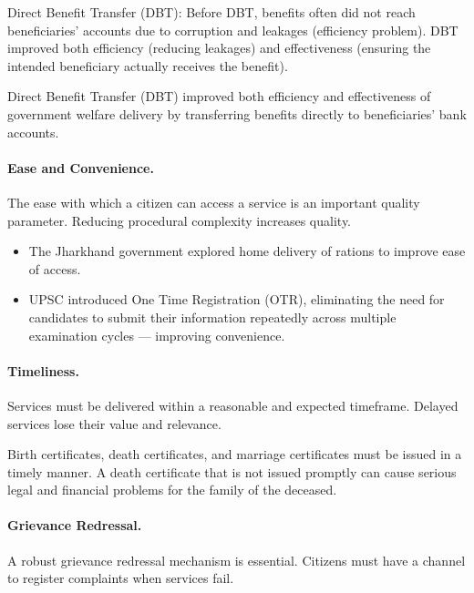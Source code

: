 \begin{ExampleBox}
Direct Benefit Transfer (DBT): Before DBT, benefits often did not reach beneficiaries' accounts due to corruption and leakages (efficiency problem). DBT improved both efficiency (reducing leakages) and effectiveness (ensuring the intended beneficiary actually receives the benefit).
\end{ExampleBox}

\begin{GovtPolicy}
Direct Benefit Transfer (DBT) improved both efficiency and effectiveness of government welfare delivery by transferring benefits directly to beneficiaries' bank accounts.
\end{GovtPolicy}

\paragraph{Ease and Convenience.} The ease with which a citizen can access a service is an important quality parameter. Reducing procedural complexity increases quality.

\begin{ExampleBox}
\begin{itemize}
\item The Jharkhand government explored home delivery of rations to improve ease of access.
\item UPSC introduced One Time Registration (OTR), eliminating the need for candidates to submit their information repeatedly across multiple examination cycles --- improving convenience.
\end{itemize}
\end{ExampleBox}

\paragraph{Timeliness.} Services must be delivered within a reasonable and expected timeframe. Delayed services lose their value and relevance.

\begin{ExampleBox}
Birth certificates, death certificates, and marriage certificates must be issued in a timely manner. A death certificate that is not issued promptly can cause serious legal and financial problems for the family of the deceased.
\end{ExampleBox}

\paragraph{Grievance Redressal.} A robust grievance redressal mechanism is essential. Citizens must have a channel to register complaints when services fail.

